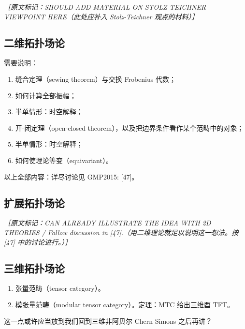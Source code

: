 {\small\itshape ［原文标记：SHOULD ADD MATERIAL ON STOLZ-TEICHNER VIEWPOINT HERE（此处应补入 Stolz-Teichner 观点的材料）］}

\subsection{二维拓扑场论} %

需要说明：
\begin{enumerate}
  \item 缝合定理（sewing theorem）与交换 Frobenius 代数；
  \item 如何计算全部振幅；
  \item 半单情形：时空解释；
  \item 开-闭定理（open-closed theorem），以及把边界条件看作某个范畴中的对象；
  \item 半单情形：时空解释；
  \item 如何使理论等变（equivariant）。
\end{enumerate}
以上全部内容：详尽讨论见 GMP2015: [47]。

\subsection{扩展拓扑场论} %

{\small\itshape ［原文标记：CAN ALREADY ILLUSTRATE THE IDEA WITH 2D THEORIES / Follow discussion in [47].（用二维理论就足以说明这一想法。按 [47] 中的讨论进行。）］}

\subsection{三维拓扑场论} %

\begin{enumerate}
  \item[5.] 张量范畴（tensor category）。
  \item[6.] 模张量范畴（modular tensor category）。定理：MTC 给出三维酉 TFT。
\end{enumerate}
这一点或许应当放到我们回到三维非阿贝尔 Chern-Simons 之后再讲？

